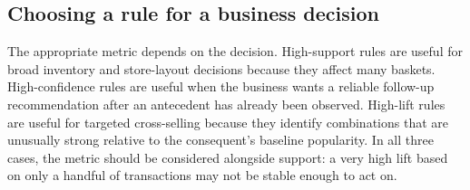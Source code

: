 \documentclass[12pt,a4paper]{article}
\begin{document}
\subsection{Choosing a rule for a business decision}

The appropriate metric depends on the decision. High-support rules are useful for broad
inventory and store-layout decisions because they affect many baskets. High-confidence rules
are useful when the business wants a reliable follow-up recommendation after an antecedent
has already been observed. High-lift rules are useful for targeted cross-selling because they
identify combinations that are unusually strong relative to the consequent's baseline
popularity. In all three cases, the metric should be considered alongside support: a very
high lift based on only a handful of transactions may not be stable enough to act on.
\end{document}
